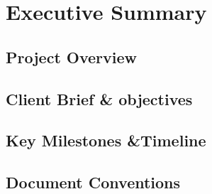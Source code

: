 %



\section{Executive Summary}

\subsection{Project Overview}
\subsection{Client Brief \& objectives}
\subsection{Key Milestones \&Timeline}
\subsection{Document Conventions}